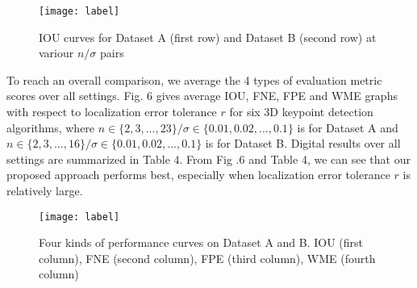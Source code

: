 \documentclass[runningheads]{article}
\begin{document}
\begin{figure}[!htb]
	\centering
	
	\texttt{[image: label]}
	\begin{minipage}[b]{1\linewidth}
		\caption{IOU curves for Dataset A (first row) and Dataset B (second row) at variour \emph{$n/\sigma$} pairs}
	\end{minipage}
\end{figure}

To reach an overall comparison, we average the 4 types of evaluation metric scores over all settings. Fig. 6 gives average IOU, FNE, FPE and WME graphs with respect to localization error tolerance \emph{$r$} for six 3D keypoint detection algorithms, where \emph{$n \in \{2,3,...,23\} / \sigma \in \{0.01,0.02,...,0.1\}$} is for Dataset A and \emph{$n \in \{2,3,...,16\} / \sigma \in \{0.01,0.02,...,0.1\}$} is for Dataset B. Digital results over all settings are summarized in Table 4. From Fig .6 and Table 4, we can see that our proposed approach performs best, especially when localization error tolerance \emph{$r$} is relatively large.

\begin{figure}[!htb]
	\centering
	
	\texttt{[image: label]}
	\begin{minipage}[b]{1\linewidth}
		\caption{Four kinds of performance curves on Dataset A and B. IOU (first column), FNE (second column), FPE (third column), WME (fourth column)}
	\end{minipage}
\end{figure}
\end{document}
